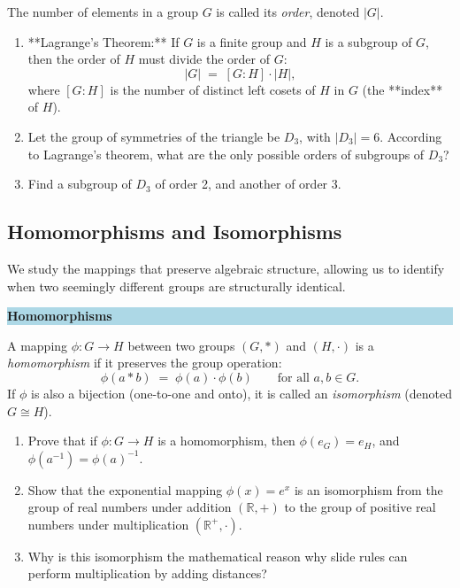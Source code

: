 \documentclass[12pt, a4paper]{article}
\newenvironment{namedconcept}[1]
  {\par\medskip\fillcolorbox{LightBlue}{NavyBlue}{#1}}
  {\par\medskip}
\newcommand{\fillcolorbox}[3]{%
  \noindent
  \filldrawbox{#1}{#2}{\textbf{\sffamily\color{white}#3}}\par\nobreak\vspace{4pt}
}
\newcommand{\filldrawbox}[3]{%
  \colorbox{#1}{\parbox{\dimexpr\linewidth-2\fboxsep\relax}{%
    \vspace{4pt}\noindent\hspace{4pt}#3\vspace{4pt}%
  }}%
}
\newcommand{\newterm}[1]{\textit{\textcolor{DiscoveryColor}{#1}}}
\begin{document}
The number of elements in a group $G$ is called its \newterm{order}, denoted $|G|$.
\begin{enumerate}[label=(\alph*), leftmargin=*]
  \item **Lagrange's Theorem:** If $G$ is a finite group and $H$ is a subgroup of $G$, then the order of $H$ must divide the order of $G$:
  \[
    |G| \;=\; [G:H] \cdot |H|,
  \]
  where $[G:H]$ is the number of distinct left cosets of $H$ in $G$ (the **index** of $H$).
  \item Let the group of symmetries of the triangle be $D_3$, with $|D_3| = 6$.
        According to Lagrange's theorem, what are the only possible orders of subgroups of $D_3$?
  \item Find a subgroup of $D_3$ of order 2, and another of order 3.
\end{enumerate}

\subsection{Homomorphisms and Isomorphisms}

We study the mappings that preserve algebraic structure, allowing us to identify when two seemingly different groups are structurally identical.

\begin{namedconcept}{Homomorphisms}
A mapping $\phi: G \to H$ between two groups $(G, *)$ and $(H, \cdot)$ is a \newterm{homomorphism} if it preserves the group operation:
\[
  \phi(a * b) \;=\; \phi(a) \cdot \phi(b) \qquad \text{for all } a, b \in G.
\]
If $\phi$ is also a bijection (one-to-one and onto), it is called an \newterm{isomorphism} (denoted $G \cong H$).
\end{namedconcept}

\begin{enumerate}[label=(\alph*), leftmargin=*]
  \item Prove that if $\phi: G \to H$ is a homomorphism, then $\phi(e_G) = e_H$, and $\phi(a^{-1}) = \phi(a)^{-1}$.
  \item Show that the exponential mapping $\phi(x) = e^x$ is an isomorphism from the group of real numbers under addition $(\mathbb{R}, +)$ to the group of positive real numbers under multiplication $(\mathbb{R}^+, \cdot)$.
  \item Why is this isomorphism the mathematical reason why slide rules can perform multiplication by adding distances?
\end{enumerate}
\end{document}

